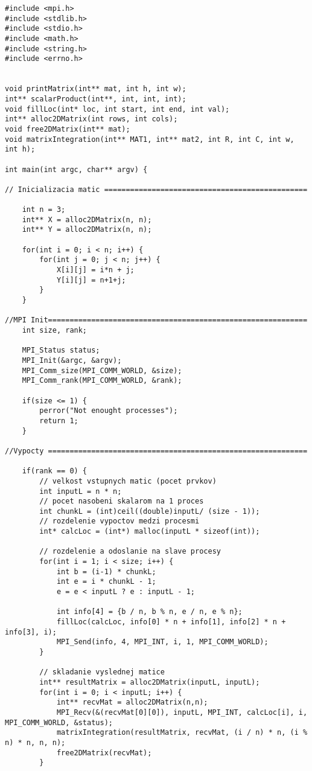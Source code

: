 \documentclass{report}
\begin{document}
\begin{lstlisting}
#include <mpi.h>
#include <stdlib.h>
#include <stdio.h> 
#include <math.h>
#include <string.h>
#include <errno.h>


void printMatrix(int** mat, int h, int w);
int** scalarProduct(int**, int, int, int);
void fillLoc(int* loc, int start, int end, int val);
int** alloc2DMatrix(int rows, int cols);
void free2DMatrix(int** mat);
void matrixIntegration(int** MAT1, int** mat2, int R, int C, int w, int h);

int main(int argc, char** argv) {

// Inicializacia matic ===============================================

	int n = 3;
	int** X = alloc2DMatrix(n, n);
	int** Y = alloc2DMatrix(n, n);

	for(int i = 0; i < n; i++) {
		for(int j = 0; j < n; j++) {
			X[i][j] = i*n + j;
			Y[i][j] = n+1+j;
		}
	}

//MPI Init============================================================
	int size, rank;

	MPI_Status status;
	MPI_Init(&argc, &argv);
	MPI_Comm_size(MPI_COMM_WORLD, &size);
	MPI_Comm_rank(MPI_COMM_WORLD, &rank); 

	if(size <= 1) {
		perror("Not enought processes");
		return 1;
	}
	
//Vypocty ============================================================
	
	if(rank == 0) {
		// velkost vstupnych matic (pocet prvkov)
		int inputL = n * n; 
		// pocet nasobeni skalarom na 1 proces
		int chunkL = (int)ceil((double)inputL/ (size - 1));
		// rozdelenie vypoctov medzi procesmi
		int* calcLoc = (int*) malloc(inputL * sizeof(int));

		// rozdelenie a odoslanie na slave procesy
		for(int i = 1; i < size; i++) {
			int b = (i-1) * chunkL;
			int e = i * chunkL - 1;
			e = e < inputL ? e : inputL - 1;

			int info[4] = {b / n, b % n, e / n, e % n};
			fillLoc(calcLoc, info[0] * n + info[1], info[2] * n + info[3], i);
			MPI_Send(info, 4, MPI_INT, i, 1, MPI_COMM_WORLD);
		}

		// skladanie vyslednej matice
		int** resultMatrix = alloc2DMatrix(inputL, inputL);
		for(int i = 0; i < inputL; i++) {
			int** recvMat = alloc2DMatrix(n,n);
			MPI_Recv(&(recvMat[0][0]), inputL, MPI_INT, calcLoc[i], i, MPI_COMM_WORLD, &status);
			matrixIntegration(resultMatrix, recvMat, (i / n) * n, (i % n) * n, n, n);
			free2DMatrix(recvMat);
		}


\end{lstlisting}
\end{document}
